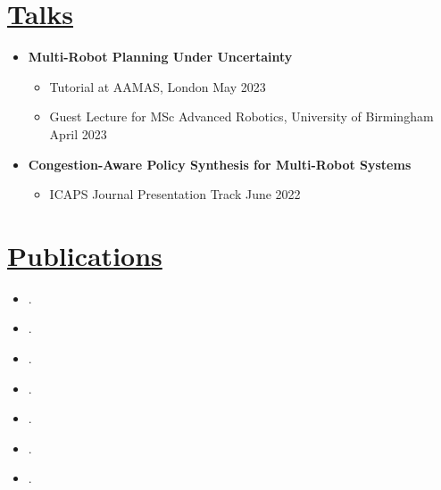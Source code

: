 \documentclass[11pt]{article}
\begin{document}
\vspace{-10pt}
\section*{\uline{Talks\hfill}}
\vspace{-5pt}
\begin{itemize}
\item \textbf{Multi-Robot Planning Under Uncertainty}
\begin{itemize}
\item Tutorial at AAMAS, London \hfill May 2023
\item Guest Lecture for MSc Advanced Robotics, University of Birmingham \hfill April 2023
\end{itemize}
\item \textbf{Congestion-Aware Policy Synthesis for Multi-Robot Systems}
\begin{itemize}
\item ICAPS Journal Presentation Track \hfill June 2022
\end{itemize}
\end{itemize}

\vspace{-10pt}
\section*{\uline{Publications\hfill}}
\vspace{-5pt}
\begin{itemize}
\item[\cite{street2023formal}] .
\item[\cite{zhang2023multi}] .
\item[\cite{street2023analysing}] .
\item[\cite{lacerda2022decision}] .
\item[\cite{street2022context}] .
\item[\cite{street2021congestion}] .	
\item[\cite{street2020multi}] .
\end{itemize}
\end{document}

